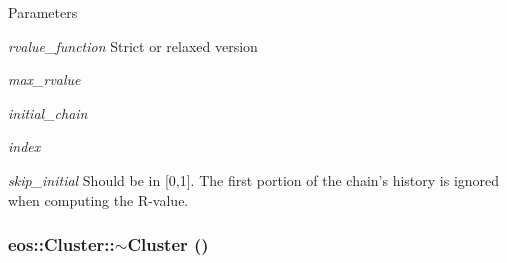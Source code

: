 \begin{DoxyParams}{Parameters}
\item[{\em rvalue\_\-function}]Strict or relaxed version \item[{\em max\_\-rvalue}]\item[{\em initial\_\-chain}]\item[{\em index}]\item[{\em skip\_\-initial}]Should be in \mbox{[}0,1\mbox{]}. The first portion of the chain's history is ignored when computing the R-\/value. \end{DoxyParams}
\hypertarget{classeos_1_1Cluster_a7bbc57a377c4d638830c3f4768c0b1b7}{
\subsubsection[{$\sim$Cluster}]{\setlength{\rightskip}{0pt plus 5cm}eos::Cluster::$\sim$Cluster ()}}
\label{classeos_1_1Cluster_a7bbc57a377c4d638830c3f4768c0b1b7}


